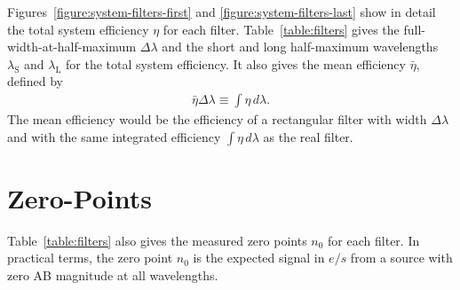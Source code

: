Figures~\ref{figure:system-filters-first} and \ref{figure:system-filters-last} show in detail the total system efficiency $\eta$ for each filter. Table~\ref{table:filters} gives the full-width-at-half-maximum $\Delta\lambda$ and the short and long half-maximum wavelengths $\lambda_\mathrm{S}$ and $\lambda_\mathrm{L}$ for the total system efficiency. It also gives the mean efficiency $\bar\eta$, defined by
\begin{align}
\bar\eta \Delta\lambda \equiv \int \eta\,d\lambda.
\end{align}
The mean efficiency would be the efficiency of a rectangular filter with width $\Delta\lambda$ and with the same integrated efficiency $\int \eta\,d\lambda$ as the real filter.

\section{Zero-Points}




Table~\ref{table:filters} also gives the measured zero points $n_0$ for each filter. In practical terms, the zero point $n_0$ is the expected signal in $\unit{e/s}$ from a source with zero AB magnitude at all wavelengths.
